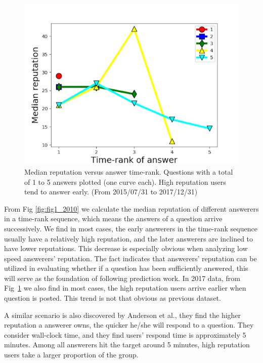 \begin{figure}[!t]
    \centering
    \includegraphics[width=0.7\columnwidth]{img/Fig1_2017.pdf}
    \caption{Median reputation versus answer time-rank. Questions with a total of 1 to 5 answers plotted (one curve each). High reputation users tend to answer early. (From 2015/07/31 to 2017/12/31)}
    \label{fig:fig1_2017}
\end{figure}

From Fig \ref{fig:fig1_2010} we calculate the median reputation of different answerers in a time-rank sequence, which means the answers of a question arrive successively. We find in most cases, the early answerers in the time-rank sequence usually have a relatively high reputation, and the later answerers are inclined to have lower reputations. This decrease is especially obvious when analyzing low speed answerers' reputation. The fact indicates that answerers' reputation can be utilized in evaluating whether if a question has been sufficiently answered, this will serve as the foundation of following prediction work. In 2017 data, from Fig~\ref{fig:fig1_2017} we also find in most cases, the high reputation users arrive earlier when question is posted. This trend is not that obvious as previous dataset.


A similar scenario is also discovered by Anderson et al.\cite{anderson2012discovering}, they find the higher reputation a answerer owns, the quicker he/she will respond to a question. They consider wall-clock time, and they find users' respond time is approximately 5 minutes. Among all answerers hit the target around 5 minutes, high reputation users take a larger proportion of the group. 


